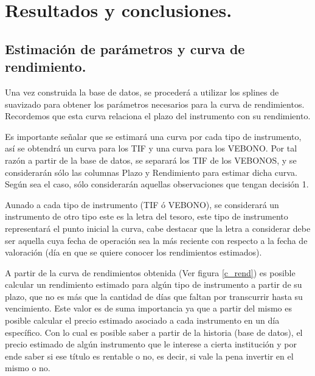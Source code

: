 \chapter{Resultados y conclusiones.}




\section{Estimaci\'on de par\'ametros y curva de rendimiento.}

\hspace{0.4cm} Una vez construida la base de datos, se proceder\'a a utilizar los splines de suavizado para obtener los par\'ametros necesarios para la curva de rendimientos. Recordemos que esta curva relaciona el plazo del instrumento con su rendimiento.


\hspace{0.4cm} Es importante se\~nalar que se estimar\'a una curva por cada tipo de instrumento, as\'i se obtendr\'a un curva para los TIF y una curva para los VEBONO. Por tal raz\'on a partir de la base de datos, se separar\'a los TIF de los VEBONOS, y se considerar\'an s\'olo las columnas Plazo y Rendimiento para estimar dicha curva. Seg\'un sea el caso, s\'olo considerar\'an aquellas observaciones que tengan decisi\'on 1.


\hspace{0.4cm} Aunado a cada tipo de instrumento (TIF \'o VEBONO), se considerar\'a un instrumento de otro tipo este es la letra del tesoro, este tipo de instrumento representar\'a el punto inicial la curva, cabe destacar que la letra a considerar debe ser aquella cuya fecha de operaci\'on sea la m\'as reciente con respecto a la fecha de valoraci\'on (d\'ia en que se quiere conocer los rendimientos estimados).


\hspace{0.4cm} A partir de la curva de rendimientos obtenida (Ver figura \ref{c_rend}) es posible calcular un rendimiento estimado para alg\'un tipo de instrumento a partir de su plazo, que no es m\'as que la cantidad de d\'ias que faltan por transcurrir hasta su vencimiento. Este valor es de suma importancia ya que a partir del mismo es posible calcular el precio estimado asociado a cada instrumento en un d\'ia espec\'ifico. Con lo cual es posible saber a partir de la historia (base de datos), el precio estimado de alg\'un instrumento que le interese a cierta instituci\'on y por ende saber si ese t\'itulo es rentable o no, es decir, si vale la pena invertir en el mismo o no.

